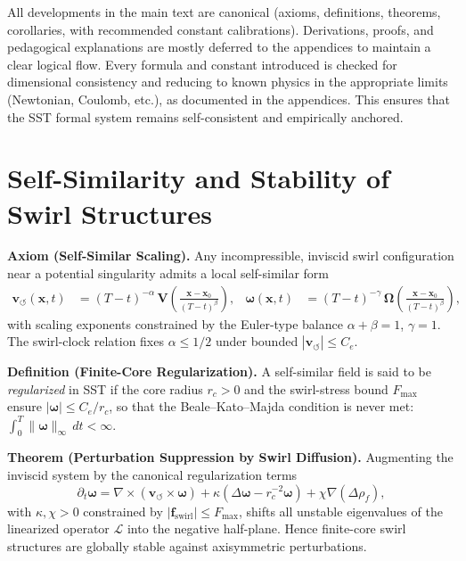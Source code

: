 \documentclass[10pt,reprint,aps,onecolumn,nofootinbib]{revtex4-2}
\begin{document}
	All developments in the main text are canonical (axioms, definitions, theorems, corollaries, with recommended constant calibrations). Derivations, proofs, and pedagogical explanations are mostly deferred to the appendices to maintain a clear logical flow. Every formula and constant introduced is checked for dimensional consistency and reducing to known physics in the appropriate limits (Newtonian, Coulomb, etc.), as documented in the appendices. This ensures that the SST formal system remains self-consistent and empirically anchored.


    \section{Self-Similarity and Stability of Swirl Structures}
    \label{sec:self-similarity}

    \textbf{Axiom (Self-Similar Scaling).}
    Any incompressible, inviscid swirl configuration near a potential singularity admits a local
    self-similar form
    \begin{align}
        \mathbf{v}_{\!\boldsymbol{\circlearrowleft}}(\mathbf{x},t)
        &= (T-t)^{-\alpha}\,
        \mathbf{V}\!\left(\frac{\mathbf{x}-\mathbf{x}_0}{(T-t)^{\beta}}\right),
        &
        \boldsymbol{\omega}(\mathbf{x},t)
        &= (T-t)^{-\gamma}\,
        \boldsymbol{\Omega}\!\left(\frac{\mathbf{x}-\mathbf{x}_0}{(T-t)^{\beta}}\right),
    \end{align}
    with scaling exponents constrained by the Euler-type balance
    $\alpha+\beta=1$, $\gamma=1$.  The swirl-clock relation fixes
    \(\alpha \le 1/2\) under bounded
    \(|\mathbf{v}_{\!\boldsymbol{\circlearrowleft}}|\le C_e\).

    \textbf{Definition (Finite-Core Regularization).}
    A self-similar field is said to be \emph{regularized} in SST if the core radius
    \(r_c>0\) and the swirl-stress bound \(F_{\max}\) ensure
    \(|\boldsymbol{\omega}| \le C_e/r_c\),
    so that the Beale–Kato–Majda condition is never met:
    \(\displaystyle \int_0^T \|\boldsymbol{\omega}\|_{\infty}\,dt < \infty.\)

    \textbf{Theorem (Perturbation Suppression by Swirl Diffusion).}
    Augmenting the inviscid system by the canonical regularization terms
    \begin{equation}
        \partial_t\boldsymbol{\omega}
        = \nabla\times(\mathbf{v}_{\!\boldsymbol{\circlearrowleft}}\!\times\!\boldsymbol{\omega})
        +\kappa(\Delta\boldsymbol{\omega}-r_c^{-2}\boldsymbol{\omega})
        +\chi\nabla(\Delta\rho_{\!f}),
    \end{equation}
    with $\kappa,\chi>0$ constrained by $|\mathbf{f}_{\text{swirl}}|\!\le\! F_{\max}$,
    shifts all unstable eigenvalues of the linearized operator
    $\mathcal{L}$ into the negative half-plane.
    Hence finite-core swirl structures are globally stable against axisymmetric perturbations.
\end{document}
